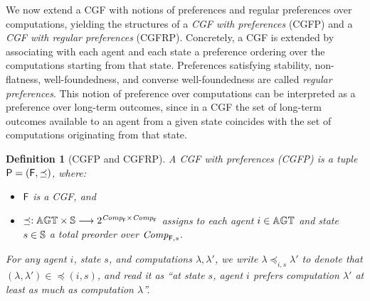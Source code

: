\documentclass{article}
\newtheorem{definition}{Definition}
\begin{document}
We now extend a CGF with notions of preferences and regular preferences over computations, yielding the structures of a \emph{CGF with preferences} (CGFP) and a \emph{CGF with regular preferences} (CGFRP). 
Concretely, a CGF is extended by associating with each agent and each state a preference ordering over the computations starting from that state. 
Preferences satisfying stability, non-flatness, well-foundedness, and converse well-foundedness are called \emph{regular preferences}. 
This notion of preference over computations can be interpreted as a preference over long-term outcomes, since in a CGF the set of long-term outcomes available to an agent from a given state coincides with the set of computations originating from that state. 
 \begin{definition}[CGFP and CGFRP]\label{def: CGFP and CGFRP}
 A CGF with preferences (CGFP) is a tuple $\mathsf{P} = (\mathsf{F}, \preceq)$, where:
 \begin{itemize}
     \item $\mathsf{F}$ is a CGF, and 
     \item $\preceq: \mathbb{AGT} \times \mathbb{S} \longrightarrow 2^{\mathit{Comp}_{\mathsf{F}}\times \mathit{Comp}_{\mathsf{F}}}$ assigns to each agent $i \in \mathbb{AGT}$ and state $s \in \mathbb{S}$ a total preorder over $\mathit{Comp}_{\mathsf{F},s}$. 
 \end{itemize}
For any agent $i$, state $s$, and computations $\lambda, \lambda'$, we write
$\lambda \preceq_{i,s} \lambda'$ to denote that $(\lambda,\lambda') \in \preceq(i,s)$,
and read it as ``at state $s$, agent $i$ prefers computation $\lambda'$ at least as much as computation $\lambda$''.

 


\end{definition}
\end{document}
